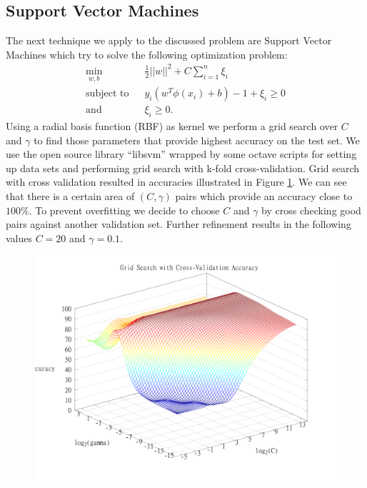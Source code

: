 \documentclass{article}
\begin{document}
\subsection{Support Vector Machines}
The next technique we apply to the discussed problem are Support Vector Machines \cite{Bishop200608} which try to solve the following optimization problem:
\begin{align*}
\min_{w,b} &~~ \frac{1}{2}||w||^2 + C \sum_{i=1}^{n} \xi_i\\
\text{subject to } &~~ y_i(w^T \phi(x_i) + b) - 1 + \xi_i \ge 0\\
\text{and} &~~ \xi_i \ge 0.
\end{align*}
Using a radial basis function (RBF) as kernel we perform a grid search over $C$ and $\gamma$ to find those parameters that provide highest accuracy on the test set. We use the open source library ``libsvm'' \cite{chang2011libsvm} wrapped by some octave scripts for setting up data sets and performing grid search with k-fold cross-validation. Grid search with cross validation resulted in accuracies illustrated in Figure \ref{fig:svm_grid_search}. We can see that there is a certain area of $(C,\gamma)$ pairs which provide an accuracy close to $100\%$. To prevent overfitting we decide to choose $C$ and $\gamma$ by cross checking good pairs against another validation set. Further refinement results in the following values $C = 20$ and $\gamma = 0.1$.
\begin{figure}[ht]
	\centerline{\includegraphics[scale=0.20, trim=0 0 10 0]{../gridSearchSVMPlot}}
	\caption{}
	\label{fig:svm_grid_search}
\end{figure}
\end{document}
